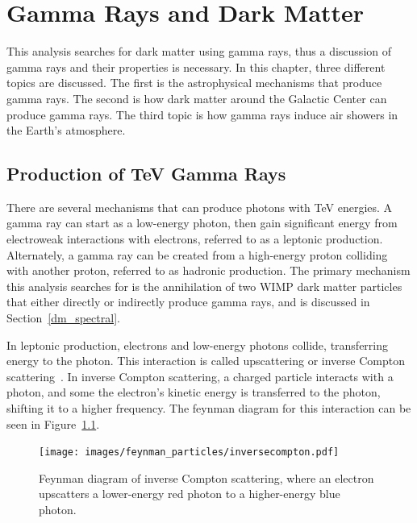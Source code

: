 \cleartooddpage[\thispagestyle{empty}]

\newcommand{\Lim}[1]{\raisebox{0.5ex}{\scalebox{0.8}{$\displaystyle \lim_{#1}\;$}}}
\renewcommand{\labelitemi}{\textbullet}

\chapter{Gamma Rays and Dark Matter}\label{ch_gamma}


This analysis searches for dark matter using gamma rays, thus a discussion of gamma rays and their properties is necessary.
In this chapter, three different topics are discussed.
The first is the astrophysical mechanisms that produce gamma rays.
The second is how dark matter around the Galactic Center can produce gamma rays.
The third topic is how gamma rays induce air showers in the Earth's atmosphere.

\section{Production of TeV Gamma Rays}

  There are several mechanisms that can produce photons with TeV energies.
  A gamma ray can start as a low-energy photon, then gain significant energy from electroweak interactions with electrons, referred to as a leptonic production.
  Alternately, a gamma ray can be created from a high-energy proton colliding with another proton, referred to as hadronic production.
  The primary mechanism this analysis searches for is the annihilation of two WIMP dark matter particles that either directly or indirectly produce gamma rays, and is discussed in Section~\ref{dm_spectral}.

  In leptonic production, electrons and low-energy photons collide, transferring energy to the photon.
  This interaction is called upscattering or inverse Compton scattering~\cite{compton_effect}.
  In inverse Compton scattering, a charged particle interacts with a photon, and some the electron's kinetic energy is transferred to the photon, shifting it to a higher frequency.
  The feynman diagram for this interaction can be seen in Figure~\ref{fig:inv_compt_feyn}.
  
  \begin{figure}[ht]
    \centering
    \texttt{[image: images/feynman\_particles/inversecompton.pdf]}
    \caption[Inverse Compton Scattering Feynman Diagram]{
      Feynman diagram of inverse Compton scattering, where an electron upscatters a lower-energy red photon to a higher-energy blue photon.
    }
    \label{fig:inv_compt_feyn}
  \end{figure}
  \FloatBarrier
  
